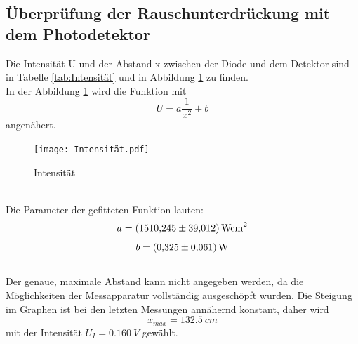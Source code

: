 \subsection{Überprüfung der Rauschunterdrückung mit dem Photodetektor}
Die Intensität U und der Abstand x zwischen der Diode und dem Detektor sind in Tabelle \ref{tab:Intensität} und in Abbildung \ref{fig:Intensität} zu finden.
\\In der Abbildung \ref{fig:Intensität} wird die Funktion mit
\begin{equation*}
  U=a \frac{1}{x^2}+b
\end{equation*}
angenähert.
\begin{figure}[h!]
  \centering
  \texttt{[image: Intensität.pdf]}
  \caption{Intensität}
  \label{fig:Intensität}
\end{figure}

\\Die Parameter der gefitteten Funktion lauten:
\begin{equation*}
  a= \SI{1510.245 \pm 39.012}{W cm^2}
\end{equation*}
\begin{equation*}
  b=\SI{0.325\pm 0.061}{W}
\end{equation*}
\\Der genaue, maximale Abstand kann nicht angegeben werden, da die Möglichkeiten der Messapparatur vollständig ausgeschöpft wurden.
Die Steigung im Graphen ist bei den letzten Messungen annähernd konstant, daher wird
\begin{equation*}
  x_{max}=\SI{132.5}{cm}
\end{equation*}
 mit der Intensität $U_{I}=\SI{0.160}{V}$ gewählt.
\FloatBarrier





